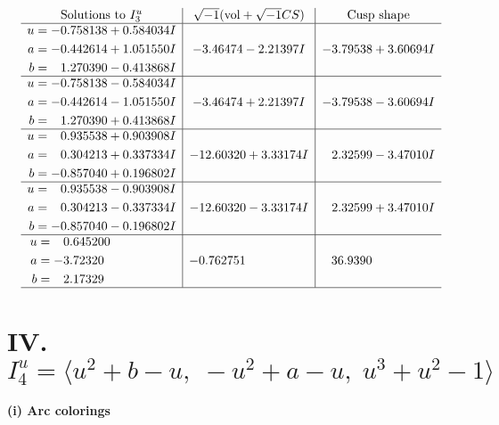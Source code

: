 \documentclass[1p]{elsarticle_modified}
\theoremstyle{definition}
\newcommand{\I}{\sqrt{-1}}
\begin{document}
$$\begin{array}{c|c|c}  
\text{Solutions to }I^u_{3}& \I (\text{vol} + \sqrt{-1}CS) & \text{Cusp shape}\\
 \hline 
\begin{aligned}
u &= -0.758138 + 0.584034 I \\
a &= -0.442614 + 1.051550 I \\
b &= \phantom{-}1.270390 - 0.413868 I\end{aligned}
 & -3.46474 - 2.21397 I & -3.79538 + 3.60694 I \\ \hline\begin{aligned}
u &= -0.758138 - 0.584034 I \\
a &= -0.442614 - 1.051550 I \\
b &= \phantom{-}1.270390 + 0.413868 I\end{aligned}
 & -3.46474 + 2.21397 I & -3.79538 - 3.60694 I \\ \hline\begin{aligned}
u &= \phantom{-}0.935538 + 0.903908 I \\
a &= \phantom{-}0.304213 + 0.337334 I \\
b &= -0.857040 + 0.196802 I\end{aligned}
 & -12.60320 + 3.33174 I & \phantom{-}2.32599 - 3.47010 I \\ \hline\begin{aligned}
u &= \phantom{-}0.935538 - 0.903908 I \\
a &= \phantom{-}0.304213 - 0.337334 I \\
b &= -0.857040 - 0.196802 I\end{aligned}
 & -12.60320 - 3.33174 I & \phantom{-}2.32599 + 3.47010 I \\ \hline\begin{aligned}
u &= \phantom{-}0.645200\phantom{ +0.000000I} \\
a &= -3.72320\phantom{ +0.000000I} \\
b &= \phantom{-}2.17329\phantom{ +0.000000I}\end{aligned}
 & -0.762751\phantom{ +0.000000I} & \phantom{-}36.9390\phantom{ +0.000000I}\\
 \hline 
 \end{array}$$\newpage\newpage\renewcommand{\arraystretch}{1}
\centering \section*{IV. $I^u_{4}= \langle u^2+b- u,\;- u^2+a- u,\;u^3+u^2-1 \rangle$}
\flushleft \textbf{(i) Arc colorings}\\
\end{document}
